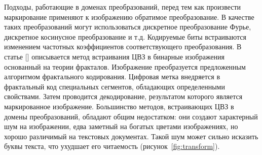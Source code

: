 \documentclass[12pt,a4paper]{article}
\begin{document}
Подходы, работающие в доменах преобразований, перед тем как произвести маркирование применяют к изображению обратимое преобразование.
В качестве таких преобразований могут использоваться дискретное преобразование Фурье, дискретное косинусное преобразование и т.д.
Кодируемые биты встраиваются изменением частотных коэффициентов соответствующего преобразования.
В статье [] описывается метод встраивания ЦВЗ в бинарные изображения основанный на теории фракталов.
Изображение преобразуется предложенным алгоритмом фрактального кодирования.
Цифровая метка внедряется в фрактальный код специальных сегментов, обладающих определенными свойствами.
Затем проводится декодирование, результатом которого является маркированное изображение.
Большинство методов, встраивающих ЦВЗ в домены преобразований, обладают общим недостатком: они создают характерный шум на изображении, едва заметный на богатых цветами изображениях, но хорошо различимый на текстовых документах.
Такой шум может сильно исказить буквы текста, что ухудшает его читаемость (рисунок~\ref{fig:transform}).
\newpage
\end{document}

